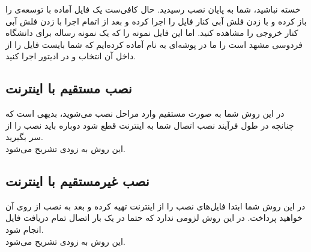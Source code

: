 خسته نباشید، شما به پایان نصب رسیدید. حال کافی‌ست یک فایل آماده با توسعه‌ی  را باز کرده و با زدن فلش آبی کنار  فایل را اجرا کرده و بعد از اتمام اجرا با زدن فلش آبی کنار  خروجی را مشاهده کنید. اما این فایل نمونه را که یک نمونه رساله برای دانشگاه فردوسی مشهد است را ما در پوشه‌ای به نام  آماده کرده‌ایم که شما بایست فایل  را از داخل آن انتخاب و در ادیتور  اجرا کنید.
\subsection{نصب مستقیم با اینترنت}
در این روش شما به صورت مستقیم وارد مراحل نصب می‌شوید، بدیهی است که چنانچه در طول فرآیند نصب اتصال شما به اینترنت قطع شود دوباره باید نصب را از سر بگیرید.\\
این روش به زودی تشریح می‌شود.
\subsection{نصب غیرمستقیم با اینترنت}
در این روش شما ابتدا فایل‌های نصب را از اینترنت تهیه کرده و بعد به نصب از روی آن خواهید پرداخت. در این روش لزومی ندارد که حتما در یک بار اتصال تمام دریافت فایل انجام شود.\\
این روش به زودی تشریح می‌شود.
%
